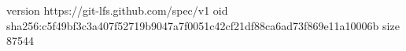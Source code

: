 version https://git-lfs.github.com/spec/v1
oid sha256:c5f49bf3c3a407f52719b9047a7f0051c42cf21df88ca6ad73f869e11a10006b
size 87544
